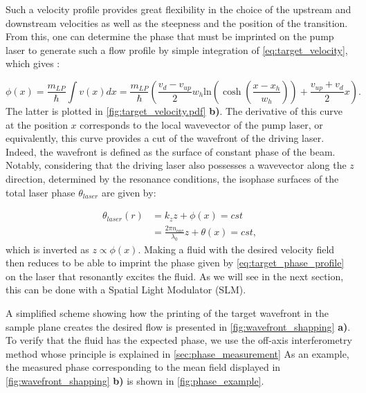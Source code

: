 Such a velocity profile provides great flexibility in the choice of the upstream and downstream velocities as well as the steepness and the position of the transition. From this, one can determine the phase that must be imprinted on the pump laser to generate such a flow profile by simple integration of \autoref{eq:target_velocity}, which gives :

\begin{equation}
    \phi(x) = \dfrac{m_{LP}}{\hbar} \int v(x) dx = \dfrac{m_{LP}}{\hbar} \left( \dfrac{v_{d}-v_{up}}{2} w_h \mathrm{ln}(\cosh(\dfrac{x-x_h}{w_h}))+\dfrac{v_{up}+v_{d}}{2}x \right).
    \label{eq:target_phase_profile}
\end{equation}
The latter is plotted in \autoref{fig:target_velocity.pdf} \textbf{b)}. The derivative of this curve at the position $x$ corresponds to the local wavevector of the pump laser, or equivalently, this curve provides a cut of the wavefront of the driving laser.
 Indeed, the wavefront is defined as the surface of constant phase of the beam. Notably, considering that the driving laser also possesses a wavevector along the $z$ direction, determined by the resonance conditions, the isophase surfaces of the total laser phase $\theta_{laser}$ are given by:  

\begin{equation}
    \begin{aligned}
    \theta_{laser}(r)&=k_zz+\phi(x)=cst \\
                      &=\frac{2\pi n_{cav} }{\lambda_0}z+\theta(x)= cst,
    \end{aligned}
\end{equation}
which is inverted as $z\propto \phi(x)$. Making a fluid with the desired velocity field then reduces to be able to imprint the phase given by \autoref{eq:target_phase_profile} on the laser that resonantly excites the fluid. As we will see in the next section, this can be done with a Spatial Light Modulator (SLM). 

 A simplified scheme showing how the printing of the target wavefront in the sample plane creates the desired flow is presented in \autoref{fig:wavefront_shapping} \textbf{a)}.
To verify that the fluid has the expected phase, we use the off-axis interferometry method whose principle is explained in \autoref{sec:phase_measurement}
As an example, the measured phase corresponding to the mean field displayed in \autoref{fig:wavefront_shapping} \textbf{b)} is shown in \autoref{fig:phase_example}.
 
